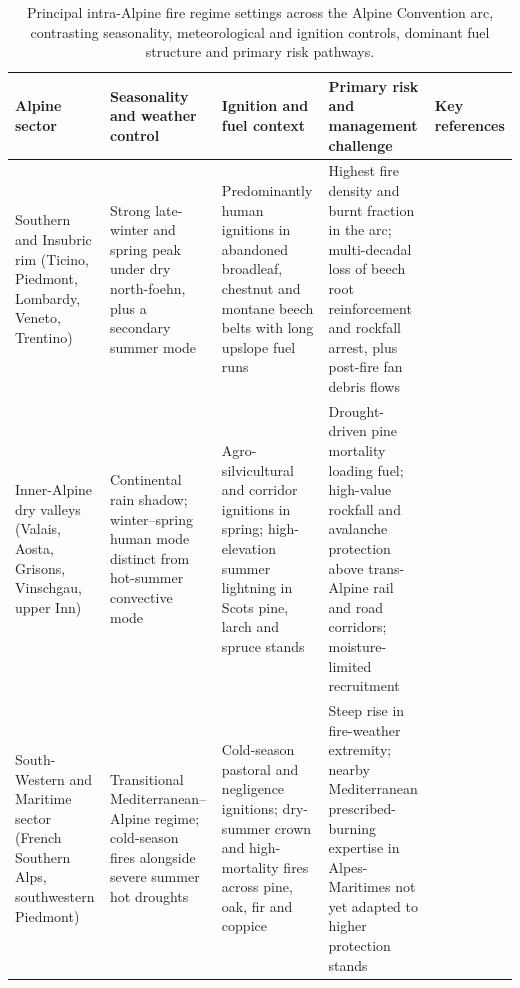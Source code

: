 \documentclass[11pt,a4paper]{article}
\begin{document}
\begin{table}[htbp]
\centering
\footnotesize
\setlength{\tabcolsep}{4pt}
\renewcommand{\arraystretch}{1.12}
\caption{Principal intra-Alpine fire regime settings across the Alpine Convention arc, contrasting seasonality, meteorological and ignition controls, dominant fuel structure and primary risk pathways.}
\label{tab:regimes}
\begin{tabularx}{\textwidth}{@{}>{\raggedright\arraybackslash}p{2.3cm} >{\raggedright\arraybackslash}p{2.9cm} >{\raggedright\arraybackslash}p{3.0cm} >{\raggedright\arraybackslash}X >{\raggedright\arraybackslash}p{2.7cm}@{}}
\toprule
\textbf{Alpine sector} & \textbf{Seasonality and weather control} & \textbf{Ignition and fuel context} & \textbf{Primary risk and management challenge} & \textbf{Key references} \\
\midrule
Southern and Insubric rim (Ticino, Piedmont, Lombardy, Veneto, Trentino) & Strong late-winter and spring peak under dry north-foehn, plus a secondary summer mode & Predominantly human ignitions in abandoned broadleaf, chestnut and montane beech belts with long upslope fuel runs & Highest fire density and burnt fraction in the arc; multi-decadal loss of beech root reinforcement and rockfall arrest, plus post-fire fan debris flows & \citealp{conedera_characterizing_2018, wastl_largescale_2013, maringer_temporal_2016, gehring_shallow_2019, tiranti_wildfires_2021} \\[3pt]
Inner-Alpine dry valleys (Valais, Aosta, Grisons, Vinschgau, upper Inn) & Continental rain shadow; winter--spring human mode distinct from hot-summer convective mode & Agro-silvicultural and corridor ignitions in spring; high-elevation summer lightning in Scots pine, larch and spruce stands & Drought-driven pine mortality loading fuel; high-value rockfall and avalanche protection above trans-Alpine rail and road corridors; moisture-limited recruitment & \citealp{zumbrunnen_human_2012, vacchiano_modeling_2018, conedera_lightninginduced_2006, moser_potential_2010, moos_climate_2021} \\[3pt]
South-Western and Maritime sector (French Southern Alps, southwestern Piedmont) & Transitional Mediterranean--Alpine regime; cold-season fires alongside severe summer hot droughts & Cold-season pastoral and negligence ignitions; dry-summer crown and high-mortality fires across pine, oak, fir and coppice & Steep rise in fire-weather extremity; nearby Mediterranean prescribed-burning expertise in Alpes-Maritimes not yet adapted to higher protection stands & \citealp{wastl_recent_2012, dupire_vulnerability_2019, muller_forest_2020, gamba_prescribed_2025} \\[3pt]

\end{tabularx}
\end{table}
\end{document}
